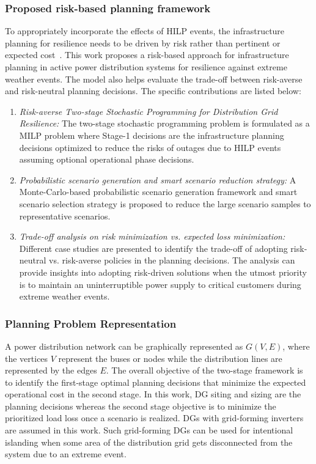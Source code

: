 \documentclass[hidelinks, 12pt]{article}
\begin{document}
\subsubsection{Proposed risk-based planning framework}
To appropriately incorporate the effects of HILP events, the infrastructure planning for resilience needs to be driven by risk rather than pertinent or expected cost~\cite{risk_averse_generation}. This work proposes a risk-based approach for infrastructure planning in active power distribution systems for resilience against extreme weather events. The model also helps evaluate the trade-off between risk-averse and risk-neutral planning decisions. The specific contributions are listed below:

\begin{enumerate}
    \item \textit{Risk-averse Two-stage Stochastic Programming for Distribution Grid Resilience:} The two-stage stochastic programming problem is formulated as a MILP problem where Stage-1 decisions are the infrastructure planning decisions optimized to reduce the risks of outages due to HILP events assuming optional operational phase decisions.
    \item \textit{Probabilistic scenario generation and smart scenario reduction strategy:} A Monte-Carlo-based probabilistic scenario generation framework and smart scenario selection strategy is proposed to reduce the large scenario samples to representative scenarios.
    \item \textit{Trade-off analysis on risk minimization vs. expected loss minimization:} Different case studies are presented to identify the trade-off of adopting risk-neutral vs. risk-averse policies in the planning decisions. The analysis can provide insights into adopting risk-driven solutions when the utmost priority is to maintain an uninterruptible power supply to critical customers during extreme weather events.
\end{enumerate}

\subsubsection{Planning Problem Representation}

A power distribution network can be graphically represented as $G(V,E)$, where the vertices $V$ represent the buses or nodes while the distribution lines are represented by the edges $E$. The overall objective of the two-stage framework is to identify the first-stage optimal planning decisions that minimize the expected operational cost in the second stage. In this work, DG siting and sizing are the planning decisions whereas the second stage objective is to minimize the prioritized load loss once a scenario is realized. DGs with grid-forming inverters are assumed in this work. Such grid-forming DGs can be used for intentional islanding when some area of the distribution grid gets disconnected from the system due to an extreme event. 
\end{document}
